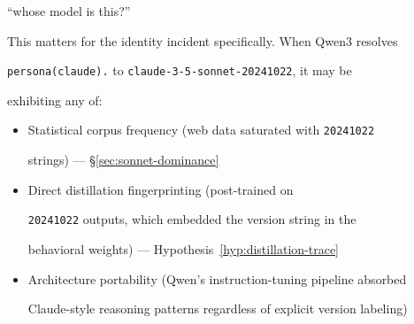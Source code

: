 ``whose model is this?''











This matters for the identity incident specifically. When Qwen3 resolves





\texttt{persona(claude).} to \texttt{claude-3-5-sonnet-20241022}, it may be





exhibiting any of:











\begin{itemize}





  \item Statistical corpus frequency (web data saturated with \texttt{20241022}





    strings) --- \S\ref{sec:sonnet-dominance}





  \item Direct distillation fingerprinting (post-trained on





    \texttt{20241022} outputs, which embedded the version string in the





    behavioral weights) --- Hypothesis~\ref{hyp:distillation-trace}





  \item Architecture portability (Qwen's instruction-tuning pipeline absorbed





    Claude-style reasoning patterns regardless of explicit version labeling)





\end{itemize}











